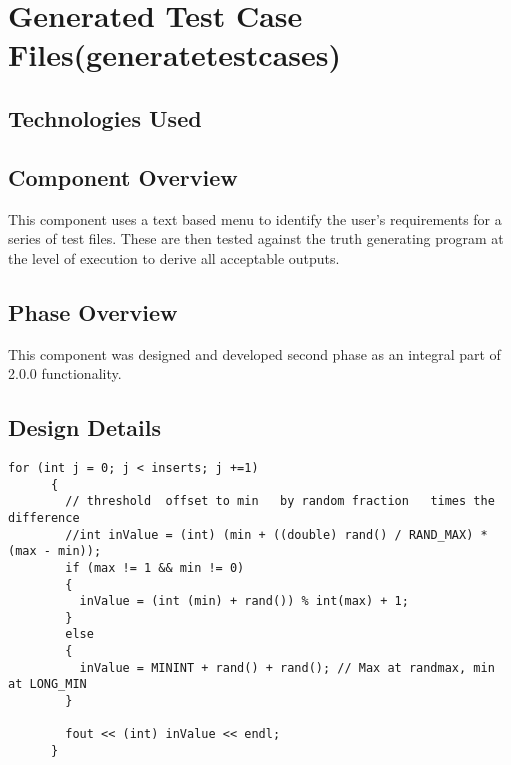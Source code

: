 \section{Generated Test Case Files(generatetestcases)}

\subsection{Technologies  Used}

\subsection{Component  Overview}
This component uses a text based menu to identify the user's requirements for a series of test files.  These are then tested against the truth generating program at the level of execution to derive all acceptable outputs.

\subsection{Phase Overview}
This component was designed and developed second phase as an integral part of 2.0.0 functionality.

\subsection{Design Details}
\begin{lstlisting}
for (int j = 0; j < inserts; j +=1)
      {
        // threshold  offset to min   by random fraction   times the difference
        //int inValue = (int) (min + ((double) rand() / RAND_MAX) * (max - min));
        if (max != 1 && min != 0)
        {
          inValue = (int (min) + rand()) % int(max) + 1;
        }
        else
        {
          inValue = MININT + rand() + rand(); // Max at randmax, min at LONG_MIN
        }

        fout << (int) inValue << endl;
      }
\end{lstlisting}
